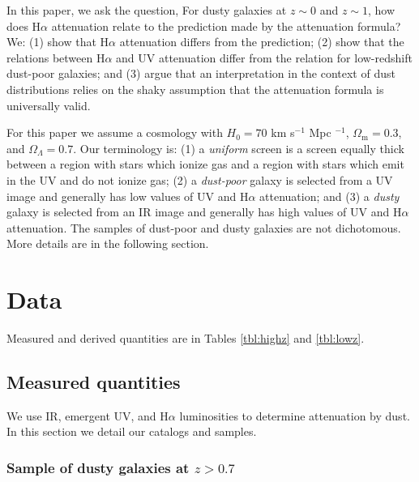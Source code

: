 \documentclass[preprint]{aastex}
\begin{document}
In this paper, we ask the question, For dusty galaxies at $z \sim 0$ and
$z \sim 1$, how does H$\alpha$ attenuation relate to the prediction made by
the \citet{calzetti00} attenuation formula?  We: (1) show that H$\alpha$
attenuation differs from
the prediction; (2) show that the relations between H$\alpha$ and UV
attenuation differ from the relation for low-redshift dust-poor galaxies; and
(3) argue that an interpretation in the context of dust distributions relies on
the shaky assumption that the \citet{calzetti00} attenuation formula is
universally valid.

For this paper we assume a cosmology with $H_{0} = 70$ km s$^{-1}$ Mpc $^{-1}$,
$\Omega_{\mathrm{m}} = 0.3$, and $\Omega_{\Lambda} = 0.7$.  Our terminology
is: (1) a \emph{uniform} screen is a screen equally thick between a region with
stars which ionize gas and a region with stars which emit in the UV and do not
ionize gas; (2) a \emph{dust-poor} galaxy is selected from a UV image and
generally has low values of UV and H$\alpha$ attenuation; and (3) a \emph{dusty}
galaxy is selected from an IR image and generally has high values of UV and
H$\alpha$ attenuation.  The samples of dust-poor and dusty galaxies are not
dichotomous.  More details are in the following section.

\section{Data}\label{sec:data}

Measured and derived quantities are in Tables \ref{tbl:highz} and
\ref{tbl:lowz}.

\subsection{Measured quantities}

We use IR, emergent UV, and H$\alpha$ luminosities to determine attenuation by
dust.  In this section we detail our catalogs and samples.

\subsubsection{Sample of dusty galaxies at $z > 0.7$}
\end{document}
